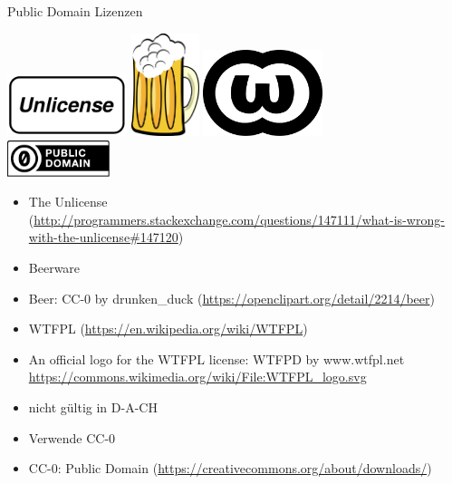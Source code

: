{\begin{frame}{Public Domain Lizenzen}
	\begin{center}
		\includegraphics[width=3.5cm]{res/unlicense-logo.pdf}
		\hfill
		\includegraphics[height=3cm]{res/beer.pdf}
		\hfill
		\includegraphics[height=2.5cm]{res/WTFPL_logo.pdf}
		\\
		\vspace{1cm}
		\includegraphics[width=3cm]{res/cc-zero.pdf}
	\end{center}
\end{frame}
\note
{
	\begin{itemize}
		\item The Unlicense (\url{http://programmers.stackexchange.com/questions/147111/what-is-wrong-with-the-unlicense\#147120})
		\item Beerware
		\item Beer: CC-0 by drunken\_duck (\url{https://openclipart.org/detail/2214/beer})
		\item WTFPL (\url{https://en.wikipedia.org/wiki/WTFPL})
		\item An official logo for the WTFPL license: WTFPD by www.wtfpl.net \url{https://commons.wikimedia.org/wiki/File:WTFPL_logo.svg}
		\item nicht gültig in D-A-CH
		\item Verwende CC-0
		\item CC-0: Public Domain (\url{https://creativecommons.org/about/downloads/})
	\end{itemize}
}

}
